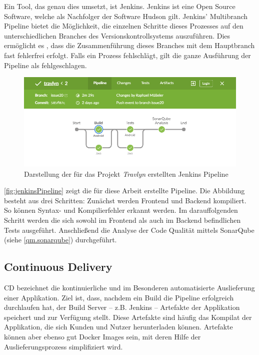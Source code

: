 			Ein Tool, das genau dies umsetzt, ist Jenkins. Jenkins ist eine Open Source Software, welche als Nachfolger der Software Hudson gilt. Jenkins' Multibranch Pipeline bietet die Möglichkeit, die einzelnen Schritte dieses Prozesses auf den unterschiedlichen Branches des Versionskontrollsystems auszuführen. Dies ermöglicht es \zB, dass die Zusammenführung dieses Branches mit dem Hauptbranch fast fehlerfrei erfolgt. Falls ein Prozess fehlschlägt, gilt die ganze Ausführung der Pipeline als fehlgeschlagen. \cite{CloudBees.322020}
			
			\begin{figure}[ht!]
				\centering
				\includegraphics[width=1\textwidth]{images/jenkins-pipeline.png}
				\caption{Darstellung der für das Projekt \textit{Travlyn} erstellten Jenkins Pipeline}
				\label{fig:jenkinsPipeline}
			\end{figure} 
		
			\autoref{fig:jenkinsPipeline} zeigt die für diese Arbeit erstellte Pipeline. Die Abbildung besteht aus drei Schritten: Zunächst werden Frontend und Backend kompiliert. So können Syntax- und Kompilierfehler erkannt werden. Im darauffolgenden Schritt werden die sich sowohl im Frontend als auch im Backend befindlichen Tests ausgeführt. Anschließend die Analyse der Code Qualität mittels SonarQube (siehe \autoref{qm.sonarqube}) durchgeführt. 
		
		\subsection{Continuous Delivery}
		
			\ac{CD} bezeichnet die kontinuierliche und im Besonderen automatisierte Auslieferung einer Applikation. Ziel ist, dass, nachdem ein Build die Pipeline erfolgreich durchlaufen hat, der Build Server -- z.B. Jenkins -- Artefakte der Applikation speichert und zur Verfügung stellt. Diese Artefakte sind häufig das Kompilat der Applikation, die sich Kunden und Nutzer herunterladen können. Artefakte können aber ebenso gut Docker Images sein, mit deren Hilfe der Auslieferungsprozess simplifiziert wird. \cite{Humble.2011}
		                                                                                                                                                                                                                                                                                                                                         
	